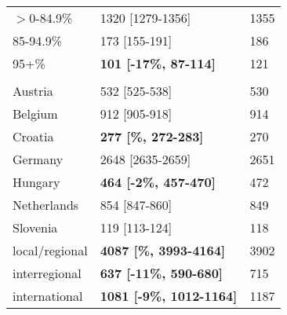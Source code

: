 \begin{tabular}{L{4.9cm} R{5.2cm} L{2cm}}
\hspace{1em}$>$0-84.9\% & 1320   [1279-1356] & 1355\\
\hspace{1em}85-94.9\% & 173    [155-191] & 186\\
\hspace{1em}95+\% & \textbf{101    [-17\%, 87-114]} & 121\\
\addlinespace[0.3em]
\\
\hspace{1em}Austria & 532    [525-538] & 530\\
\hspace{1em}Belgium & 912    [905-918] & 914\\
\hspace{1em}Croatia & \textbf{277    [\%, 272-283]} & 270\\
\hspace{1em}Germany & 2648   [2635-2659] & 2651\\
\hspace{1em}Hungary & \textbf{464    [-2\%, 457-470]} & 472\\
\hspace{1em}Netherlands & 854    [847-860] & 849\\
\hspace{1em}Slovenia & 119    [113-124] & 118\\
\hspace{1em}local/regional & \textbf{4087   [\%, 3993-4164]} & 3902\\
\hspace{1em}interregional & \textbf{637    [-11\%, 590-680]} & 715\\
\hspace{1em}international & \textbf{1081   [-9\%, 1012-1164]} & 1187\\
\bottomrule
\end{tabular}
